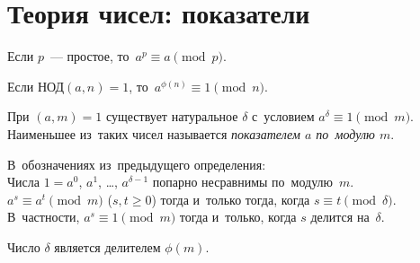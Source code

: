 \section*{Теория чисел: показатели}



\begingroup\providecommand\ifincludesolutions{\iffalse}

\ifincludesolutions
\subsection*{Версия с решениями}
\fi

Если $p$~--- простое, то~$a^p \equiv a \pmod{p}$.

Если $\text{НОД}(a, n) = 1$, то~$a^{\phi(n)} \equiv 1 \pmod{n}$.

При $(a, m) = 1$ существует натуральное $\delta$ с~условием
$a^{\delta} \equiv 1 \pmod{m}$.
Наименьшее из~таких чисел называется \emph{показателем $a$ по~модулю $m$}.

\begin{problems}

\item
В~обозначениях из~предыдущего определения:
\\
\sp
Числа $1 = a^0$, $a^1$, \ldots, $a^{\delta-1}$ попарно несравнимы
по~модулю~$m$.
\\
\sp
$a^s \equiv a^t \pmod{m}$ ($s, t \geq 0$)
тогда и~только тогда, когда
$s \equiv t \pmod{\delta}$.
В~частности, $a^s \equiv 1 \pmod{m}$
тогда и~только, когда
$s$ делится на~$\delta$.
\\
\sp
\ifincludesolutions\label{extra/algebra:phi:problem}\fi
Число $\delta$ является делителем $\phi(m)$.

\end{problems}

\ifincludesolutions
\setcounter{jeolmsubproblem}{0}%
\sp
Пусть $a^s \equiv a^t \pmod{m}$.
Тогда $a^{t} (a^{s-t} - 1)$ делится на~$m$.
То есть $(a^{s-t} - 1)$ делится на~$m$.
Но~такого быть не~может, поскольку $0 < s - t < \delta$.
\par
\sp
Сначала докажем, что $a^s \equiv 1 \pmod{m}$ тогда и только тогда, когда
$s$ делится на~$\delta$.
Пусть это не~так.
Тогда $s = x \delta + r$.
Имеем, $1 \equiv a^s \equiv (a^{\delta})^x a^r \equiv a^r \pmod{m}$.
Но~такого быть не~может из~определения показателя.
Значит, $r = 0$ и~$s$ делится на~$\delta$ без остатка.
Отсюда сразу следует, что если $a^s \equiv a^t \pmod{m}$, то~$(a^{s-t} - 1)$
делится на~$m$, то~есть $(s - t)$ делится на~$\delta$.
\par
\sp
Очевидное следствие из~теоремы Эйлера и~предыдущего пункта.
\fi %

